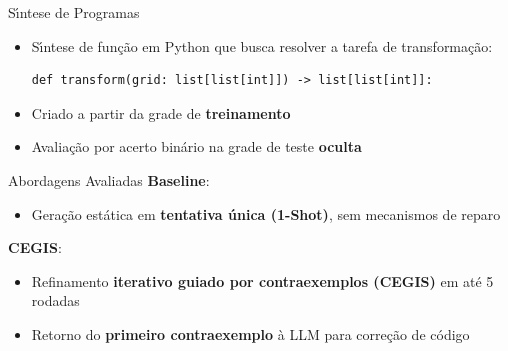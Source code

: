 \documentclass[aspectratio=169, 10pt]{beamer}
\begin{document}
\begin{frame}[fragile]{S\'{\i}ntese de Programas}
    \vspace{1.0em}
    \begin{itemize}\setlength{\itemsep}{1.1em}
        \item S\'{\i}ntese de fun\c{c}\~{a}o em Python que busca resolver a tarefa de transformação:
            \begin{center}
                \begin{verbatim}
def transform(grid: list[list[int]]) -> list[list[int]]:
                \end{verbatim}
            \end{center}
        \item Criado a partir da grade de \textbf{treinamento}
        \item Avalia\c{c}\~{a}o por acerto bin\'{a}rio na grade de teste \textbf{oculta}
    \end{itemize}
\end{frame}
\begin{frame}{Abordagens Avaliadas}
    \vspace{1.0em}
    \textbf{Baseline}:\vspace{0.5em}
    \begin{itemize}\setlength{\itemsep}{1.1em}
        \item Gera\c{c}\~{a}o est\'{a}tica em \textbf{tentativa \'{u}nica (1-Shot)}, sem mecanismos de reparo
    \end{itemize}
    \vspace{1.0em}
    \textbf{CEGIS}:\vspace{0.5em}
    \begin{itemize}\setlength{\itemsep}{1.1em}
        \item Refinamento \textbf{iterativo guiado por contraexemplos (CEGIS)} em at\'{e} 5 rodadas
        \item Retorno do \textbf{primeiro contraexemplo} \`{a} LLM para corre\c{c}\~{a}o de c\'{o}digo
    \end{itemize}
\end{frame}
\end{document}
